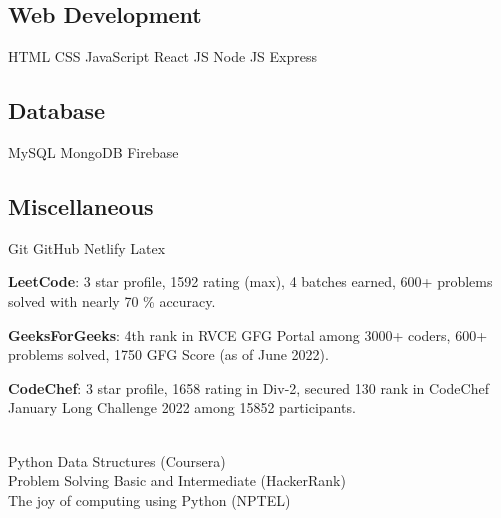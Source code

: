 \documentclass[a4paper]{MagicalCV}
\begin{document}
\begin{minipage}[t]{0.33\textwidth}
\subsection{Web Development}
HTML \textbullet{} CSS \textbullet{} JavaScript \textbullet{} React JS \textbullet{} Node JS \textbullet{} Express
\sectionsep
\subsection{Database}
MySQL \textbullet{} MongoDB \textbullet{} Firebase 
\sectionsep
\subsection{Miscellaneous}
Git \textbullet{} GitHub \textbullet{} Netlify\textbullet{} Latex
\sectionsep 


\vspace{\topsep} %
 \textbf{LeetCode}: 3 star profile, 1592 rating (max), 4 batches earned, 600+ problems solved with nearly 70 \% accuracy.


\vspace{\topsep} %
 \textbf{GeeksForGeeks}: 4th rank in RVCE GFG Portal among 3000+ coders, 600+ problems solved, 1750 GFG Score (as of June 2022).

\vspace{\topsep} %
 \textbf{CodeChef}: 3 star profile, 1658 rating in Div-2, secured 130 rank in CodeChef January Long Challenge 2022 among 15852 participants.
 
 \vspace{\topsep}\\ %
Python Data Structures (Coursera)\\
Problem Solving Basic and Intermediate (HackerRank)\\
The joy of computing using Python (NPTEL)

\end{minipage} 
\end{document}
